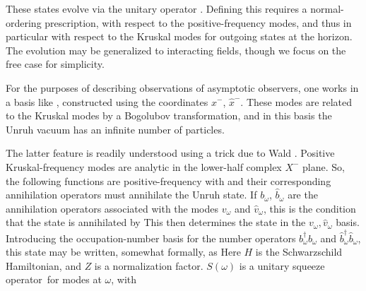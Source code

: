 These states evolve via the unitary operator \unitop.   Defining this requires a normal-ordering prescription, with respect to the positive-frequency modes, and thus in particular with respect to the Kruskal modes for outgoing states at the horizon.  The evolution may be generalized to interacting fields, though we focus on the free case for simplicity. 


For the purposes of describing observations of asymptotic observers, one works in a basis like \vki, constructed using the coordinates $x^-$, ${\hat x}^-$.  These modes are related to the Kruskal modes by a Bogolubov transformation, and in this basis the Unruh vacuum has an infinite number of particles.

The latter  feature is readily understood using a trick due to Wald .  Positive Kruskal-frequency modes are analytic in the lower-half complex $X^-$ plane.  So, the following functions are positive-frequency
%
\eqn{}
%
with
%
\eqn{}
%
and their corresponding annihilation operators must annihilate the Unruh state. If $b_\omega$, ${\hat b}_\omega$ are the annihilation operators associated with the modes $v_\omega$ and ${\hat v}_\omega$, this is the condition that the state is annihilated by
%
\eqn{}
%
This then determines the state in the $v_\omega,{\hat v}_\omega$ basis.  Introducing the occupation-number basis for the number operators $b_\omega^\dagger b_\omega$ and ${\hat b}_\omega^\dagger {\hat b}_\omega$, 
this state may be written, somewhat formally, as
%
\eqn{}
%
Here $H$ is the Schwarzschild Hamiltonian,
%
\eqn{}
% 
and
$Z$ is a normalization factor.  $S(\omega)$ is a unitary squeeze operator\CavesZZ\ for modes at $\omega$, 
%
\eqn{}
%
with
%
\eqn{}



